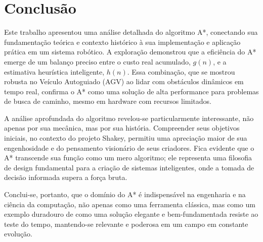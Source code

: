 \documentclass[conference]{IEEEtran}
\begin{document}
\section{Conclusão}
Este trabalho apresentou uma análise detalhada do algoritmo A*, conectando sua fundamentação teórica e contexto histórico à sua implementação e aplicação prática em um sistema robótico. A exploração demonstrou que a eficiência do A* emerge de um balanço preciso entre o custo real acumulado, $g(n)$, e a estimativa heurística inteligente, $h(n)$. Essa combinação, que se mostrou robusta no Veículo Autoguiado (AGV) ao lidar com obstáculos dinâmicos em tempo real, confirma o A* como uma solução de alta performance para problemas de busca de caminho, mesmo em hardware com recursos limitados.

A análise aprofundada do algoritmo revelou-se particularmente interessante, não apenas por sua mecânica, mas por sua história. Compreender seus objetivos iniciais, no contexto do projeto Shakey, permitiu uma apreciação maior de sua engenhosidade e do pensamento visionário de seus criadores. Fica evidente que o A* transcende sua função como um mero algoritmo; ele representa uma filosofia de design fundamental para a criação de sistemas inteligentes, onde a tomada de decisão informada supera a força bruta.

Conclui-se, portanto, que o domínio do A* é indispensável na engenharia e na ciência da computação, não apenas como uma ferramenta clássica, mas como um exemplo duradouro de como uma solução elegante e bem-fundamentada resiste ao teste do tempo, mantendo-se relevante e poderosa em um campo em constante evolução.

\end{document}
